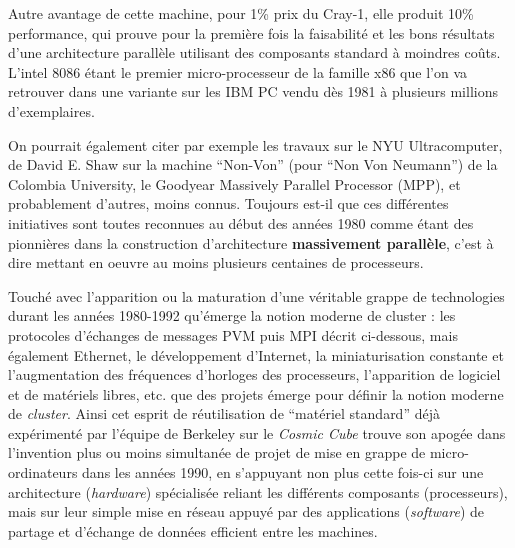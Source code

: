 Autre avantage de cette machine, pour 1\% prix du Cray-1, elle produit 10\% performance, qui prouve pour la première fois la faisabilité et les bons résultats d'une architecture parallèle utilisant des composants standard à moindres coûts. L'intel 8086 étant le premier micro-processeur de la famille x86 que l'on va retrouver dans une variante sur les IBM PC vendu dès 1981 à plusieurs millions d'exemplaires. %

On pourrait également citer par exemple les travaux sur le NYU Ultracomputer, de David E. Shaw sur la machine “Non-Von” (pour “Non Von Neumann”) de la Colombia University, le Goodyear Massively Parallel Processor (MPP), et probablement d'autres, moins connus. Toujours est-il que ces différentes initiatives sont toutes reconnues au début des années 1980 comme étant des pionnières dans la construction d’architecture \textbf{massivement parallèle}, c'est à dire mettant en oeuvre au moins plusieurs centaines de processeurs.

Touché avec l'apparition ou la maturation d'une véritable grappe de technologies durant les années 1980-1992 qu'émerge la notion moderne de cluster : les protocoles d'échanges de messages PVM puis MPI décrit ci-dessous, mais également Ethernet, le développement d'Internet, la miniaturisation constante et l'augmentation des fréquences d'horloges des processeurs, l'apparition de logiciel et de matériels libres, etc. que des projets émerge pour définir la notion moderne de \textit{cluster}. Ainsi cet esprit de réutilisation de \enquote{matériel standard} déjà expérimenté par l'équipe de Berkeley sur le \textit{Cosmic Cube} trouve son apogée dans l'invention plus ou moins simultanée de projet de mise en grappe de micro-ordinateurs dans les années 1990, en s'appuyant non plus cette fois-ci sur une architecture (\textit{hardware}) spécialisée reliant les différents composants (processeurs), mais sur leur simple mise en réseau appuyé par des applications (\textit{software}) de partage et d'échange de données efficient entre les machines.


